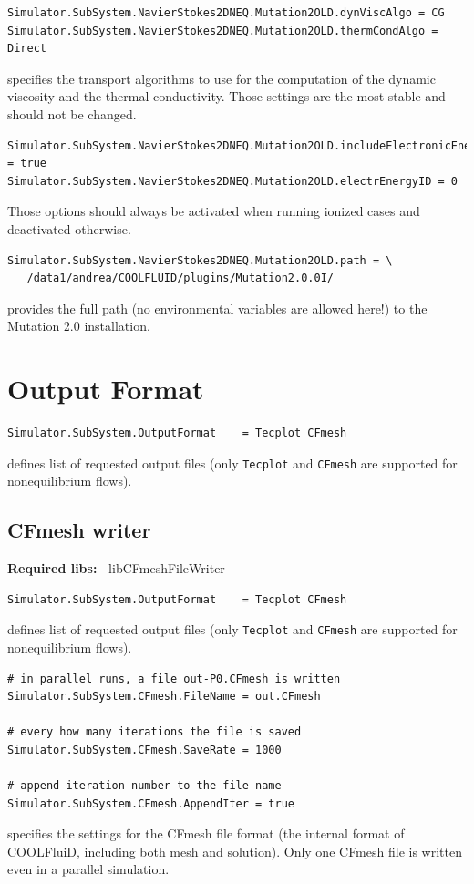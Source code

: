 \documentclass[11pt]{article}
\begin{document}
\begin{verbatim}
Simulator.SubSystem.NavierStokes2DNEQ.Mutation2OLD.dynViscAlgo = CG
Simulator.SubSystem.NavierStokes2DNEQ.Mutation2OLD.thermCondAlgo = Direct
\end{verbatim}
specifies the transport algorithms to use for the computation of the dynamic viscosity and the thermal conductivity.
Those settings are the most stable and should not be changed.

\begin{verbatim}
Simulator.SubSystem.NavierStokes2DNEQ.Mutation2OLD.includeElectronicEnergy = true
Simulator.SubSystem.NavierStokes2DNEQ.Mutation2OLD.electrEnergyID = 0
\end{verbatim}
Those options should always be activated when running ionized cases and deactivated otherwise.

\begin{verbatim}
Simulator.SubSystem.NavierStokes2DNEQ.Mutation2OLD.path = \
   /data1/andrea/COOLFLUID/plugins/Mutation2.0.0I/
\end{verbatim}
provides the full path (no environmental variables are allowed here!) to the Mutation 2.0 installation.

\section{Output Format}

\begin{verbatim}
Simulator.SubSystem.OutputFormat    = Tecplot CFmesh
\end{verbatim}
defines list of requested output files (only {\tt Tecplot} and {\tt CFmesh} are supported for nonequilibrium flows).

\subsection{CFmesh writer}

{\bf Required libs:~} libCFmeshFileWriter
           
\begin{verbatim}
Simulator.SubSystem.OutputFormat    = Tecplot CFmesh
\end{verbatim}
defines list of requested output files (only {\tt Tecplot} and {\tt CFmesh} are supported for nonequilibrium flows).

\begin{verbatim}
# in parallel runs, a file out-P0.CFmesh is written
Simulator.SubSystem.CFmesh.FileName = out.CFmesh  

# every how many iterations the file is saved  
Simulator.SubSystem.CFmesh.SaveRate = 1000

# append iteration number to the file name  	
Simulator.SubSystem.CFmesh.AppendIter = true
\end{verbatim}
specifies the settings for the CFmesh file format (the internal format of COOLFluiD, including both mesh and solution).
Only one CFmesh file is written even in a parallel simulation. 
\end{document}
